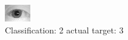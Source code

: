 \begin{figure}[h!]
\begin{center}
\includegraphics[width=0.60\columnwidth]{figures/ID1199_class_2_target_3.png}
\end{center}
\caption{ Classification: 2 actual target: 3}
\label{fig:ID1199_class_2_target_3}
\end{figure}

